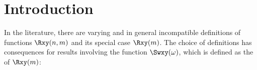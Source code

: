 \section{Introduction}
In the literature, there are varying and in general incompatible definitions of
 functions $\Rxy(n,m)$ and its  special case $\Rxy(m)$. %
The choice of definitions has consequences for results involving the  function 
$\Swxy(\omega)$, %
which is defined as the  of $\Rxy(m)$:
\begin{definition}\label{def:Swxy}
\end{definition}


